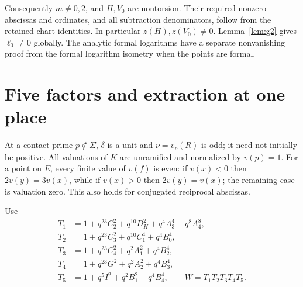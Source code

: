 \documentclass[11pt,a4paper]{article}
\begin{document}
Consequently $m\ne0,2$, and $H,V_0$ are nontorsion. Their required
nonzero abscissas and ordinates, and all subtraction denominators,
follow from the retained chart identities. In particular
$z(H),z(V_0)\ne0$. Lemma~\ref{lem:g2} gives $\ell_0\ne0$ globally.
The analytic formal logarithms have a separate nonvanishing proof
from the formal logarithm isometry when the points are formal.

\section{Five factors and extraction at one place}
At a contact prime $p\notin\Sigma$, $\delta$ is a unit and
$\nu=v_p(R)$ is odd; it need not initially be positive. All valuations
of $K$ are unramified and normalized by $v(p)=1$.
For a point on $E$, every finite value of $v(f)$ is even: if
$v(x)<0$ then $2v(y)=3v(x)$, while if $v(x)>0$ then
$2v(y)=v(x)$; the remaining case is valuation zero.
This also holds for conjugated reciprocal abscissas.

Use
\begin{align*}
 T_1&=1+q^{23}C_2^2+q^{10}D_H^2+q^4A_3^4+q^8A_4^8,\\
 T_2&=1+q^{23}C_3^2+q^{10}C_1^4+q^4B_0^4,\\
 T_3&=1+q^{23}C_4^2+q^2A_1^2+q^4B_2^4,\\
 T_4&=1+q^{23}G^2+q^2A_2^2+q^4B_3^4,\\
 T_5&=1+q^5I^2+q^2B_1^2+q^4B_4^4,
 \qquad W=T_1T_2T_3T_4T_5.
\end{align*}
\end{document}
